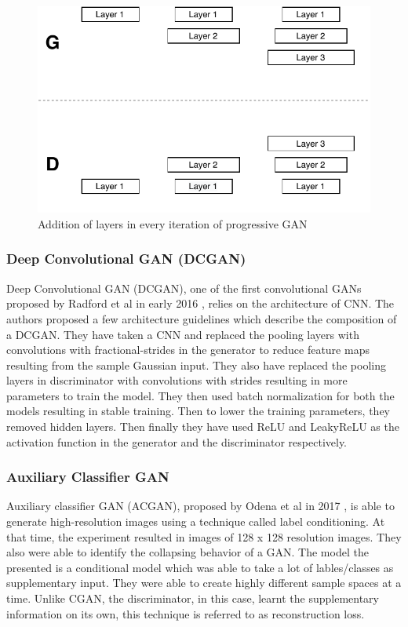 \documentclass[conference]{IEEEtran}
\begin{document}
\begin{figure}[!h]
    \centerline{\includegraphics[scale=0.7]{figures/PGAN.pdf}}
    \caption{Addition of layers in every iteration of progressive GAN}
    \label{fig3}
\end{figure}

\subsubsection{Deep Convolutional GAN (DCGAN)}
Deep Convolutional GAN (DCGAN), one of the first convolutional GANs proposed by Radford et al in early 2016 \cite{b5}, relies on the architecture of CNN. The authors proposed a few architecture guidelines which describe the composition of a DCGAN. They have taken a CNN and replaced the pooling layers with convolutions with fractional-strides in the generator to reduce feature maps resulting from the sample Gaussian input. They also have replaced the pooling layers in discriminator with convolutions with strides resulting in more parameters to train the model. They then used batch normalization for both the models resulting in stable training. Then to lower the training parameters, they removed hidden layers. Then finally they have used ReLU and LeakyReLU as the activation function in the generator and the discriminator respectively. 

\subsubsection{Auxiliary Classifier GAN}
Auxiliary classifier GAN (ACGAN), proposed by Odena et al in 2017 \cite{b7}, is able to generate high-resolution images using a technique called label conditioning. At that time, the experiment resulted in images of 128 x 128 resolution images. They also were able to identify the collapsing behavior of a GAN. The model the presented is a conditional model which was able to take a lot of lables/classes as supplementary input. They were able to create highly different sample spaces at a time. Unlike CGAN, the discriminator, in this case, learnt the supplementary information on its own, this technique is referred to as reconstruction loss. 
\end{document}
